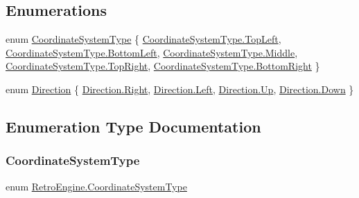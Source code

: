 \subsection*{Enumerations}
\begin{DoxyCompactItemize}
\item 
enum \mbox{\hyperlink{namespace_retro_engine_a8580bb18e66ea86e6187786c89814cea}{Coordinate\+System\+Type}} \{ \newline
\mbox{\hyperlink{namespace_retro_engine_a8580bb18e66ea86e6187786c89814ceaab32beb056fbfe36afbabc6c88c81ab36}{Coordinate\+System\+Type.\+Top\+Left}}, 
\mbox{\hyperlink{namespace_retro_engine_a8580bb18e66ea86e6187786c89814ceaa98e5a1c44509157ebcaf46c515c78875}{Coordinate\+System\+Type.\+Bottom\+Left}}, 
\mbox{\hyperlink{namespace_retro_engine_a8580bb18e66ea86e6187786c89814ceaab1ca34f82e83c52b010f86955f264e05}{Coordinate\+System\+Type.\+Middle}}, 
\mbox{\hyperlink{namespace_retro_engine_a8580bb18e66ea86e6187786c89814ceaa1d85a557894c340c318493f33bfa8efb}{Coordinate\+System\+Type.\+Top\+Right}}, 
\newline
\mbox{\hyperlink{namespace_retro_engine_a8580bb18e66ea86e6187786c89814ceaa9146bfc669fddc88db2c4d89297d0e9a}{Coordinate\+System\+Type.\+Bottom\+Right}}
 \}
\item 
enum \mbox{\hyperlink{namespace_retro_engine_ae388e2f486cdd738a44c5d7f249665e9}{Direction}} \{ \mbox{\hyperlink{namespace_retro_engine_ae388e2f486cdd738a44c5d7f249665e9a92b09c7c48c520c3c55e497875da437c}{Direction.\+Right}}, 
\mbox{\hyperlink{namespace_retro_engine_ae388e2f486cdd738a44c5d7f249665e9a945d5e233cf7d6240f6b783b36a374ff}{Direction.\+Left}}, 
\mbox{\hyperlink{namespace_retro_engine_ae388e2f486cdd738a44c5d7f249665e9a258f49887ef8d14ac268c92b02503aaa}{Direction.\+Up}}, 
\mbox{\hyperlink{namespace_retro_engine_ae388e2f486cdd738a44c5d7f249665e9a08a38277b0309070706f6652eeae9a53}{Direction.\+Down}}
 \}
\end{DoxyCompactItemize}


\subsection{Enumeration Type Documentation}
\mbox{\label{namespace_retro_engine_a8580bb18e66ea86e6187786c89814cea}} 
\subsubsection{\texorpdfstring{CoordinateSystemType}{CoordinateSystemType}}
{\footnotesize\ttfamily enum \mbox{\hyperlink{namespace_retro_engine_a8580bb18e66ea86e6187786c89814cea}{Retro\+Engine.\+Coordinate\+System\+Type}}\hspace{0.3cm}{\ttfamily [strong]}}

